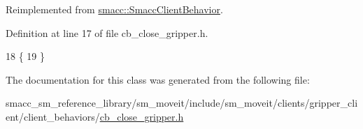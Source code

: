 Reimplemented from \hyperlink{classsmacc_1_1SmaccClientBehavior_ac0cd72d42bd00425362a97c9803ecce5}{smacc\+::\+Smacc\+Client\+Behavior}.



Definition at line 17 of file cb\+\_\+close\+\_\+gripper.\+h.


\begin{DoxyCode}
18     \{
19     \}
\end{DoxyCode}


The documentation for this class was generated from the following file\+:\begin{DoxyCompactItemize}
\item 
smacc\+\_\+sm\+\_\+reference\+\_\+library/sm\+\_\+moveit/include/sm\+\_\+moveit/clients/gripper\+\_\+client/client\+\_\+behaviors/\hyperlink{cb__close__gripper_8h}{cb\+\_\+close\+\_\+gripper.\+h}\end{DoxyCompactItemize}

